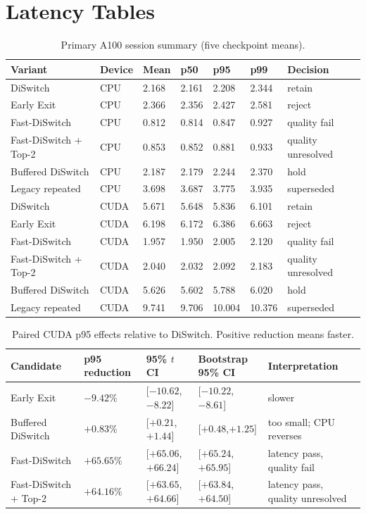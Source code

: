 \documentclass{ieeeaccess}
\begin{document}
\section{Latency Tables}

\begin{table}[t]
\caption{Primary A100 session summary (five checkpoint means).}\label{tab:a100}\small
\begin{tabularx}{\textwidth}{llYYYYY}
\toprule Variant & Device & Mean & p50 & p95 & p99 & Decision \\
\midrule
DiSwitch & CPU & 2.168 & 2.161 & 2.208 & 2.344 & retain \\
Early Exit & CPU & 2.366 & 2.356 & 2.427 & 2.581 & reject \\
Fast-DiSwitch & CPU & 0.812 & 0.814 & 0.847 & 0.927 & quality fail \\
Fast-DiSwitch + Top-2 & CPU & 0.853 & 0.852 & 0.881 & 0.933 & quality unresolved \\
Buffered DiSwitch & CPU & 2.187 & 2.179 & 2.244 & 2.370 & hold \\
Legacy repeated & CPU & 3.698 & 3.687 & 3.775 & 3.935 & superseded \\
DiSwitch & CUDA & 5.671 & 5.648 & 5.836 & 6.101 & retain \\
Early Exit & CUDA & 6.198 & 6.172 & 6.386 & 6.663 & reject \\
Fast-DiSwitch & CUDA & 1.957 & 1.950 & 2.005 & 2.120 & quality fail \\
Fast-DiSwitch + Top-2 & CUDA & 2.040 & 2.032 & 2.092 & 2.183 & quality unresolved \\
Buffered DiSwitch & CUDA & 5.626 & 5.602 & 5.788 & 6.020 & hold \\
Legacy repeated & CUDA & 9.741 & 9.706 & 10.004 & 10.376 & superseded \\
\bottomrule
\end{tabularx}
\end{table}

\begin{table}[t]
\caption{Paired CUDA p95 effects relative to DiSwitch. Positive reduction means faster.}\label{tab:paired}\small
\begin{tabularx}{\textwidth}{lYYYY}
\toprule Candidate & p95 reduction & 95\% $t$ CI & Bootstrap 95\% CI & Interpretation \\
\midrule
Early Exit & $-9.42\%$ & [$-10.62$,$-8.22$] & [$-10.22$,$-8.61$] & slower \\
Buffered DiSwitch & $+0.83\%$ & [$+0.21$,$+1.44$] & [$+0.48$,$+1.25$] & too small; CPU reverses \\
Fast-DiSwitch & $+65.65\%$ & [$+65.06$,$+66.24$] & [$+65.24$,$+65.95$] & latency pass, quality fail \\
Fast-DiSwitch + Top-2 & $+64.16\%$ & [$+63.65$,$+64.66$] & [$+63.84$,$+64.50$] & latency pass, quality unresolved \\
\bottomrule
\end{tabularx}
\end{table}
\end{document}
